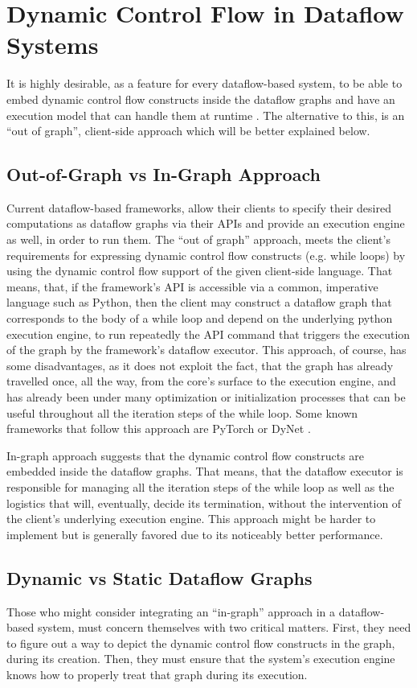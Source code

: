 \documentclass[ack,preface]{dithesis}
\begin{document}
    \section{Dynamic Control Flow in Dataflow Systems}
It is highly desirable, as a feature for every dataflow-based system, to be able to embed dynamic control flow constructs inside the dataflow graphs and have an execution model  that  can handle them at runtime \cite{Yu:2018}. The alternative to this, is an “out of graph”, client-side approach which will be better explained below.

    \subsection{Out-of-Graph vs In-Graph Approach}
Current dataflow-based frameworks, allow their clients to specify their desired computations as dataflow graphs via their APIs and provide an execution engine as well, in order to run them. The “out of graph” approach, meets the client’s requirements for expressing dynamic control flow constructs (e.g. while loops) by using the dynamic control flow support of the given client-side language. That means, that, if the framework’s API is accessible via a common, imperative language such as Python, then the client may construct a dataflow graph that corresponds to the body of a while loop and depend on the underlying python execution engine, to run repeatedly the API command that triggers the execution of the graph by the framework’s dataflow executor. This approach, of course, has some disadvantages, as it does not exploit the fact, that the graph has already travelled once, all the way, from the core’s surface to the execution engine, and has already been under many optimization or initialization processes that can be useful throughout all the iteration steps of the while loop.
Some known frameworks that follow this approach are  PyTorch \cite{Paszke2017} or DyNet  \cite{ Neubig2017DyNetTD}.

In-graph approach suggests that the dynamic control flow constructs are embedded inside the dataflow graphs. That means, that the dataflow executor is responsible for managing all the iteration steps of the while loop as well as the logistics that will, eventually, decide its termination, without the intervention of the client’s underlying execution engine.
This approach might be harder to implement but is generally favored due to its noticeably better performance.  \cite{Yu:2018}

    \subsection{Dynamic vs Static Dataflow Graphs}
Those who might consider integrating an “in-graph” approach in a dataflow-based system, must concern themselves with two critical matters. First, they need to figure out a way to depict the dynamic control flow constructs in the graph, during its creation. Then, they must ensure that  the system’s execution engine knows how to properly treat that graph during its execution.
\end{document}
